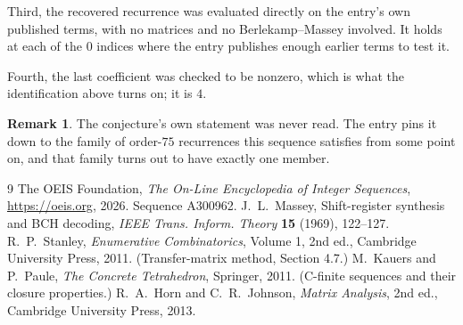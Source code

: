 \documentclass[11pt,a4paper]{article}
\theoremstyle{plain}
\theoremstyle{definition}
\newtheorem{remark}[theorem]{Remark}
\begin{document}
Third, the recovered recurrence was evaluated directly on the entry's own published terms, with
no matrices and no Berlekamp--Massey involved. It holds at each of the $0$ indices where
the entry publishes enough earlier terms to test it.

Fourth, the last coefficient was checked to be nonzero, which is what the identification above
turns on; it is $4$.

\begin{remark}
The conjecture's own statement was never read. The entry pins it down to the family of
order-$75$ recurrences this sequence satisfies from some point on, and that family turns
out to have exactly one member.
\end{remark}

\begin{thebibliography}{9}
 The OEIS Foundation, \emph{The On-Line Encyclopedia of Integer
Sequences}, \url{https://oeis.org}, 2026. Sequence A300962.
 J.~L.~Massey, Shift-register synthesis and BCH decoding, \emph{IEEE
Trans. Inform. Theory} \textbf{15} (1969), 122--127.
 R.~P.~Stanley, \emph{Enumerative Combinatorics}, Volume 1, 2nd ed.,
Cambridge University Press, 2011. (Transfer-matrix method, Section 4.7.)
 M.~Kauers and P.~Paule, \emph{The Concrete Tetrahedron}, Springer, 2011.
(C-finite sequences and their closure properties.)
 R.~A.~Horn and C.~R.~Johnson, \emph{Matrix Analysis}, 2nd ed., Cambridge
University Press, 2013.
\end{thebibliography}
\end{document}
